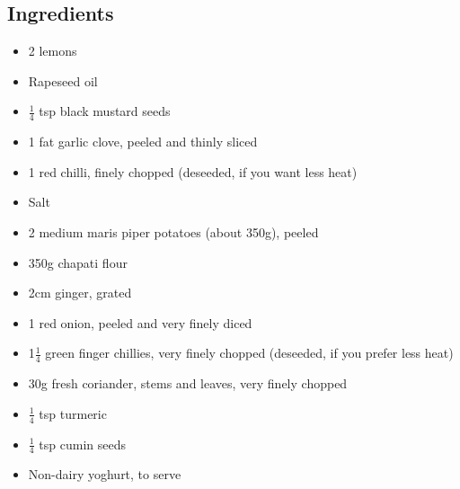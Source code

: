 \documentclass{book}
\begin{document}
\subsection*{Ingredients}
\begin{itemize}
\item 2 lemons 
\item Rapeseed oil 
\item $\frac{1}{4}$ tsp black mustard seeds 
\item 1 fat garlic clove, peeled and thinly sliced 
\item 1 red chilli, finely chopped (deseeded, if you want less heat) 
\item Salt 
\item 2 medium maris piper potatoes (about 350g), peeled
\item 350g chapati flour 
\item 2cm ginger, grated 
\item 1 red onion, peeled and very finely diced 
\item 1$\frac{1}{4}$ green finger chillies, very finely chopped (deseeded, if you prefer less heat)
\item 30g fresh coriander, stems and leaves, very finely chopped 
\item $\frac{1}{4}$ tsp turmeric 
\item $\frac{1}{4}$ tsp cumin seeds
\item Non-dairy yoghurt, to serve 
\end{itemize}
\end{document}

